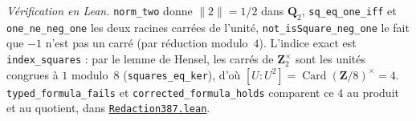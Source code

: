 \begin{sloppypar}
\noindent\emph{Vérification en Lean.} \texttt{norm\_two} donne $\|2\| = 1/2$ dans $\mathbf Q_2$, \texttt{sq\_eq\_one\_iff} et \texttt{one\_ne\_neg\_one} les deux racines carrées de l'unité, \texttt{not\_isSquare\_neg\_one} le fait que $-1$ n'est pas un carré (par réduction modulo~$4$). L'indice exact est \texttt{index\_squares} : par le lemme de Hensel, les carrés de $\mathbf Z_2^\times$ sont les unités congrues à $1$ modulo~$8$ (\texttt{squares\_eq\_ker}), d'où $[U : U^2] = \operatorname{Card}(\mathbf Z/8)^\times = 4$. \texttt{typed\_formula\_fails} et \texttt{corrected\_formula\_holds} comparent ce $4$ au produit et au quotient, dans \href{\leanblobmain/Redaction387.lean}{\texttt{Redaction387.\allowbreak{}lean}}.
\end{sloppypar}

